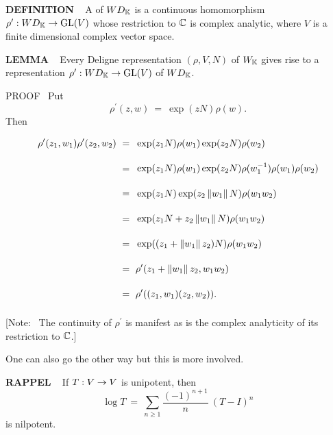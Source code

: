 \vspace{0.1cm}

\begin{x}{\small\bf DEFINITION} \ %
A 
of $WD_{\mathbb{K}}$ is a continuous homomorphism 
$\rho^\prime:WD_{\mathbb{K}} \rightarrow \text{GL}(V)$ whose restriction to $\mathbb{C}$ is complex analytic, where $V$ is a finite dimensional complex vector space.
\end{x}

\vspace{0.1cm}

\begin{x}{\small\bf LEMMA} \ %
Every Deligne representation $(\rho,V,N)$ of $W_{\mathbb{K}}$ gives rise to a representation 
$\rho^\prime:WD_{\mathbb{K}} \rightarrow \text{GL}(V)$ of $WD_{\mathbb{K}}$.

\vspace{0.1cm}

PROOF \ 
Put
\[
\rho^\prime(z,w) \ = \ \exp(z N) \rho(w).
\]
Then
\begin{align*}
\rho^\prime(z_1,w_1) \rho^\prime(z_2,w_2)   \ 
&=\vsy\  \exp(z_1 N) \rho(w_1) \exp(z_2 N) \rho(w_2) \\
&=\vsy\  \exp(z_1 N) \rho(w_1) \exp(z_2 N) \rho(w_1^{-1}) \rho(w_1)  \rho(w_2) \\
&=\vsy\  \exp(z_1 N) \exp(z_2 \norm{w_1} N) \rho(w_1 w_2)\\
&=\vsy\  \exp(z_1 N + z_2 \norm{w_1} N) \rho(w_1 w_2)\\
&=\vsy\  \exp((z_1 + \norm{w_1} z_2) N) \rho(w_1 w_2)\\
&=\vsy\  \rho^\prime(z_1 + \norm{w_1} z_2, w_1 w_2) \\
&=\vsy\  \rho^\prime((z_1, w_1)(z_2, w_2)).
\end{align*}

[Note: \ 
The continuity of $\rho^\prime$ is manifest as is the complex analyticity of its restriction to $\mathbb{C}$.]
\end{x}
\vspace{0.1cm}


One can also go the other way but this is more involved.

\vspace{0.2cm}


\begin{x}{\small\bf RAPPEL} \ %
If $T:V \rightarrow V$ is unipotent, then 
\[
\log T \ = \ \sum\limits_{n \geq 1} \frac{(-1)^{n+1}}{n} \ (T - I)^n
\]
is nilpotent.
\end{x}
\vspace{0.1cm}

